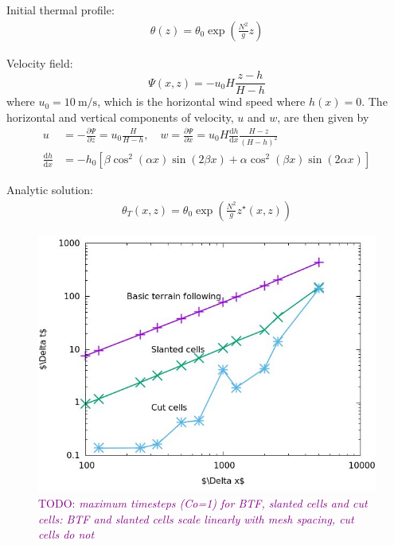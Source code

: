 \documentclass{article}
\newcommand{\TODO}[1]{\textcolor{purple}{TODO: \emph{#1}}}
\begin{document}
Initial thermal profile:
\begin{align}
	\theta(z) = \theta_0 \exp \left( \frac{N^2}{g} z \right) \label{eqn:thermal-profile}
\end{align}

Velocity field:
\begin{equation}
	\Psi(x,z) = -u_0 H \frac{z - h}{H - h} \label{eqn:streamfunc-btf}
\end{equation}
where $u_0 = \SI{10}{\meter\per\second}$, which is the horizontal wind speed where $h(x) = 0$.
The horizontal and vertical components of velocity, $u$ and $w$, are then given by
\begin{align}
	u &= -\frac{\partial \Psi}{\partial z} = u_0 \frac{H}{H - h}, \quad w = \frac{\partial \Psi}{\partial x} = u_0 H \frac{\mathrm{d} h}{\mathrm{d} x} \frac{H - z}{\left( H - h \right)^2} \label{eqn:uw-btf} \\
	\frac{\mathrm{d} h}{\mathrm{d} x} &= - h_0 \left[ 
		\beta \cos^2 \left( \alpha x \right) \sin \left( 2 \beta x \right) +
		\alpha \cos^2 \left( \beta x \right) \sin \left( 2 \alpha x \right)
	\right]
\end{align}

Analytic solution:
\begin{align}
	\theta_T(x, z) = \theta_0 \exp \left( \frac{N^2}{g} z^\star(x, z) \right) 
\end{align}

\begin{figure}
	\includegraphics[width=\textwidth]{maxTimesteps.png}
	\caption{\TODO{maximum timesteps (Co=1) for BTF, slanted cells and cut cells: BTF and slanted cells scale linearly with mesh spacing, cut cells do not}}
\end{figure}
\end{document}

